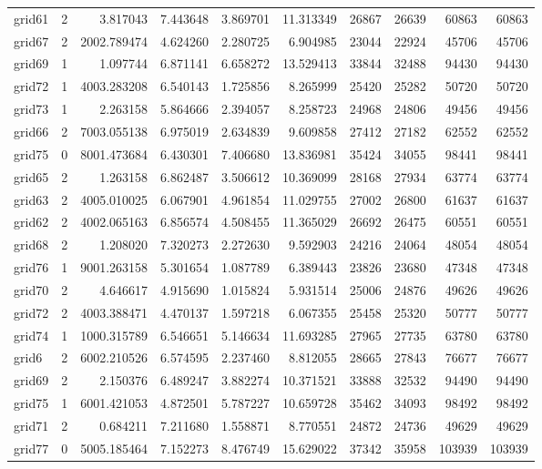 \begin{longtable}{|l|r|r|r|r|r|r|r|r|r|}
grid61 & 2 & 3.817043 & 7.443648 & 3.869701 & 11.313349 & 26867 & 26639 & 60863 & 60863 \\
grid67 & 2 & 2002.789474 & 4.624260 & 2.280725 & 6.904985 & 23044 & 22924 & 45706 & 45706 \\
grid69 & 1 & 1.097744 & 6.871141 & 6.658272 & 13.529413 & 33844 & 32488 & 94430 & 94430 \\
grid72 & 1 & 4003.283208 & 6.540143 & 1.725856 & 8.265999 & 25420 & 25282 & 50720 & 50720 \\
grid73 & 1 & 2.263158 & 5.864666 & 2.394057 & 8.258723 & 24968 & 24806 & 49456 & 49456 \\
grid66 & 2 & 7003.055138 & 6.975019 & 2.634839 & 9.609858 & 27412 & 27182 & 62552 & 62552 \\
grid75 & 0 & 8001.473684 & 6.430301 & 7.406680 & 13.836981 & 35424 & 34055 & 98441 & 98441 \\
grid65 & 2 & 1.263158 & 6.862487 & 3.506612 & 10.369099 & 28168 & 27934 & 63774 & 63774 \\
grid63 & 2 & 4005.010025 & 6.067901 & 4.961854 & 11.029755 & 27002 & 26800 & 61637 & 61637 \\
grid62 & 2 & 4002.065163 & 6.856574 & 4.508455 & 11.365029 & 26692 & 26475 & 60551 & 60551 \\
grid68 & 2 & 1.208020 & 7.320273 & 2.272630 & 9.592903 & 24216 & 24064 & 48054 & 48054 \\
grid76 & 1 & 9001.263158 & 5.301654 & 1.087789 & 6.389443 & 23826 & 23680 & 47348 & 47348 \\
grid70 & 2 & 4.646617 & 4.915690 & 1.015824 & 5.931514 & 25006 & 24876 & 49626 & 49626 \\
grid72 & 2 & 4003.388471 & 4.470137 & 1.597218 & 6.067355 & 25458 & 25320 & 50777 & 50777 \\
grid74 & 1 & 1000.315789 & 6.546651 & 5.146634 & 11.693285 & 27965 & 27735 & 63780 & 63780 \\
grid6 & 2 & 6002.210526 & 6.574595 & 2.237460 & 8.812055 & 28665 & 27843 & 76677 & 76677 \\
grid69 & 2 & 2.150376 & 6.489247 & 3.882274 & 10.371521 & 33888 & 32532 & 94490 & 94490 \\
grid75 & 1 & 6001.421053 & 4.872501 & 5.787227 & 10.659728 & 35462 & 34093 & 98492 & 98492 \\
grid71 & 2 & 0.684211 & 7.211680 & 1.558871 & 8.770551 & 24872 & 24736 & 49629 & 49629 \\
grid77 & 0 & 5005.185464 & 7.152273 & 8.476749 & 15.629022 & 37342 & 35958 & 103939 & 103939 \\

\end{longtable}
